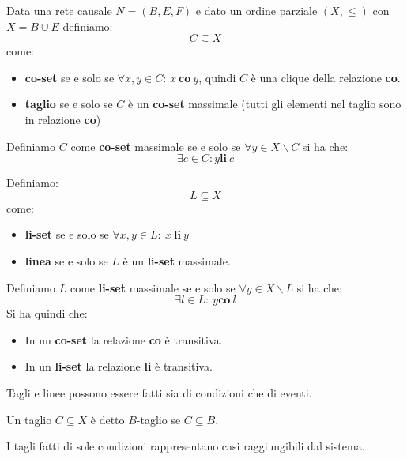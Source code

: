 \begin{definizione}
    Data una rete causale $N = (B,E, F)$ e dato un ordine parziale $(X, \leq)$
    con $X = B \cup E$ definiamo:
    \begin{equation}
        C \subseteq X
    \end{equation}
    come:
    \begin{itemize}
        \item \textbf{co-set} se e solo se $\forall x, y \in C$: $x \ \textbf{co} \ y$,
              quindi $C$ è una clique della relazione \textbf{co}.
        \item \textbf{taglio} se e solo se $C$ è un \textbf{co-set} massimale
              (tutti gli elementi nel taglio sono in relazione \textbf{co})
    \end{itemize}
    Definiamo $C$ come \textbf{co-set} massimale se e solo se $\forall y \in X \backslash C$
    si ha che:
    \begin{equation}
        \exists c \in C: y \textbf{li} \ c
    \end{equation}

    Definiamo:
    \begin{equation}
        L \subseteq X
    \end{equation}
    come:
    \begin{itemize}
        \item \textbf{li-set} se e solo se $\forall x, y \in L: \ x \ \textbf{li} \ y$
        \item \textbf{linea} se e solo se $L$ è un \textbf{li-set} massimale.
    \end{itemize}
    Definiamo $L$ come \textbf{li-set} massimale se e solo se $\forall y \in X
        \backslash L$ si ha che:
    \begin{equation}
        \exists l \in L: \ y \textbf{co}  \ l
    \end{equation}
    Si ha quindi che:
    \begin{itemize}
        \item In un \textbf{co-set} la relazione \textbf{co} è transitiva.
        \item In un \textbf{li-set} la relazione \textbf{li} è transitiva.
    \end{itemize}
    Tagli e linee possono essere fatti sia di condizioni che di eventi.
\end{definizione}
Un taglio $C \subseteq X$ è detto $B$-taglio se $C \subseteq B$.

I tagli fatti di sole condizioni rappresentano casi raggiungibili dal sistema.

